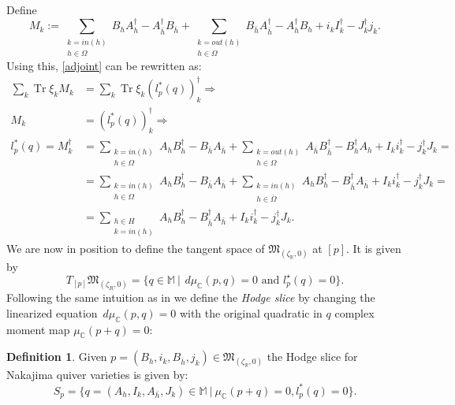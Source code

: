 \documentclass[12pt,oneside,reqno]{amsart}
\theoremstyle{definition}
\newtheorem{definition}[theorem]{Definition}
\numberwithin{equation}{section}
\numberwithin{theorem}{section}
\newcommand{\R}{\mathbb{R}}
\newcommand{\C}{\mathbb{C}}
\renewcommand{\d}[1]{\ensuremath{\operatorname{d}\!{#1}}}
\newcommand{\Tr}{\operatorname{Tr}}
\renewcommand{\d}{\dagger}
\newcommand{\hb}{\bar{h}}
\begin{document}
%
Define 
%
\begin{equation*}
M_k:=\sum\limits_{\substack{k=in(h)\\ h \in \Omega}}B_h A_h^\d -A_{\hb}^\d B_{\hb}+\sum\limits_{\substack{k=out(h)\\ h \in \Omega}}B_{\hb}A_{\hb}^\d -A_h^\d B_h+i_k I_k^\d-J_k^\d j_k.
\end{equation*}
%
Using this,  \eqref{adjoint} can be rewritten as:
%
\begin{equation*}
    \begin{split}
       \sum \limits_{k} \Tr\xi_kM_k &=\sum \limits_{k}\Tr \xi_k(l_p^*(q))_k^\d \Rightarrow \\
        M_k &=(l_p^*(q))_k^\d \Rightarrow \\
        l_p^*(q)=M_k^\d &=\sum\limits_{\substack{k=in(h)\\ h \in \Omega}}A_hB_h^\d-B_{\hb}A_{\hb}+\sum\limits_{\substack{k=out(h)\\ h \in \Omega}}A_{\hb}B_{\hb}^\d
        -B_h^\d A_h+I_ki_k^\d -j_k^\d J_k  =  \\
        &=\sum\limits_{\substack{k=in(h)\\ h \in \Omega}} A_hB_h^\d-B_{\hb}A_{\hb}+\sum\limits_{\substack{k=in(h)\\ h \in \bar \Omega}} A_hB_h^\d -B_{\hb}^\d A_{\hb}+I_ki_k^\d -j_k^\d J_k= \\
        &=\sum \limits_{\substack{h \in H \\ k=in(h)}}A_h B_h^\d-B_{\hb}^\d A_{\hb}+I_ki_k^\d -j_k^\d J_k.
\end{split}
\end{equation*}
%
We are now in position to define the tangent space of $\mathfrak M_{(\zeta_{\R},0)}$ at $[p]$. It is given by 
%
\begin{equation}
T_{[p]}\mathfrak M_{(\zeta_{R},0)} = \{ q\in \mathbb M~|~ \,d\mu_{\C}(p,q) =0 \text{ and } l^{\star}_p(q) =0\}. 
\end{equation}
%
Following the same intuition as in \cite{CW} we define the \emph{Hodge slice} by changing the linearized equation $\,d\mu_{\C}(p,q) =0$ with the original quadratic in $q$ complex moment map $\mu_{\C}(p+q) = 0$:
%
\begin{definition}
    Given  $p=(B_h,i_k,B_{\bar h },j_k)\in \mathfrak M_{(\zeta_{\R},0)}$ the Hodge slice for Nakajima quiver varieties is given by:
    \begin{equation}
        S_p=\{q=(A_h,I_k,A_{\bar h},J_k) \in \mathbb M~|~ \mu_\C(p+q)=0, l_p ^*(q)=0\}.
    \end{equation}
\end{definition}
%
\end{document}
